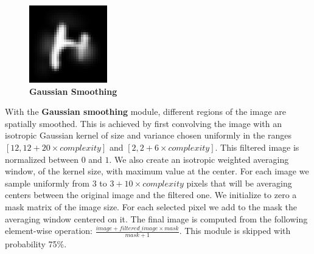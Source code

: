 \documentclass{article} %
\begin{document}
\begin{figure}
\vspace*{-3mm}
\begin{center}
\includegraphics[scale=.4]{images/Bruitgauss_only.png}\\
{\bf Gaussian Smoothing}
\end{center}
\end{figure}
With the {\bf Gaussian smoothing} module, 
different regions of the image are spatially smoothed.
This is achieved  by first convolving
the image with an isotropic Gaussian kernel of
size and variance chosen uniformly in the ranges $[12,12 + 20 \times
complexity]$ and $[2,2 + 6 \times complexity]$. This filtered image is normalized
between $0$ and $1$.  We also create an isotropic weighted averaging window, of the
kernel size, with maximum value at the center.  For each image we sample
uniformly from $3$ to $3 + 10 \times complexity$ pixels that will be
averaging centers between the original image and the filtered one.  We
initialize to zero a mask matrix of the image size. For each selected pixel
we add to the mask the averaging window centered on it.  The final image is
computed from the following element-wise operation: $\frac{image + filtered\_image
\times mask}{mask+1}$.
This module is skipped with probability 75\%.


\vspace*{1mm}
\end{document}
